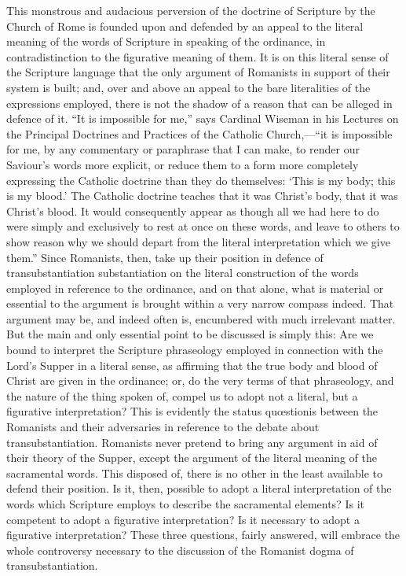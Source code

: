 \documentclass[]{book}
\begin{document}
This monstrous and audacious perversion of the doctrine of Scripture by the Church of Rome is founded upon and defended by an appeal to the literal meaning of the words of Scripture in speaking of the ordinance, in contradistinction to the figurative meaning of them. It is on this literal sense of the Scripture language that the only argument of Romanists in support of their system is built; and, over and above an appeal to the bare literalities of the expressions employed, there is not the shadow of a reason that can be alleged in defence of it. ``It is impossible for me,'' says Cardinal Wiseman in his Lectures on the Principal Doctrines and Practices of the Catholic Church,---``it is impossible for me, by any commentary or paraphrase that I can make, to render our Saviour's words more explicit, or reduce them to a form more completely expressing the Catholic doctrine than they do themselves: `This is my body; this is my blood.' The Catholic doctrine teaches that it was Christ's body, that it was Christ's blood. It would consequently appear as though all we had here to do were simply and exclusively to rest at once on these words, and leave to others to show reason why we should depart from the literal interpretation which we give them.'' Since Romanists, then, take up their position in defence of transubstantiation substantiation on the literal construction of the words employed in reference to the ordinance, and on that alone, what is material or essential to the argument is brought within a very narrow compass indeed. That argument may be, and indeed often is, encumbered with much irrelevant matter. But the main and only essential point to be discussed is simply this: Are we bound to interpret the Scripture phraseology employed in connection with the Lord's Supper in a literal sense, as affirming that the true body and blood of Christ are given in the ordinance; or, do the very terms of that phraseology, and the nature of the thing spoken of, compel us to adopt not a literal, but a figurative interpretation? This is evidently the status quœstionis between the Romanists and their adversaries in reference to the debate about transubstantiation. Romanists never pretend to bring any argument in aid of their theory of the Supper, except the argument of the literal meaning of the sacramental words. This disposed of, there is no other in the least available to defend their position. Is it, then, possible to adopt a literal interpretation of the words which Scripture employs to describe the sacramental elements? Is it competent to adopt a figurative interpretation? Is it necessary to adopt a figurative interpretation? These three questions, fairly answered, will embrace the whole controversy necessary to the discussion of the Romanist dogma of transubstantiation.
\end{document}
